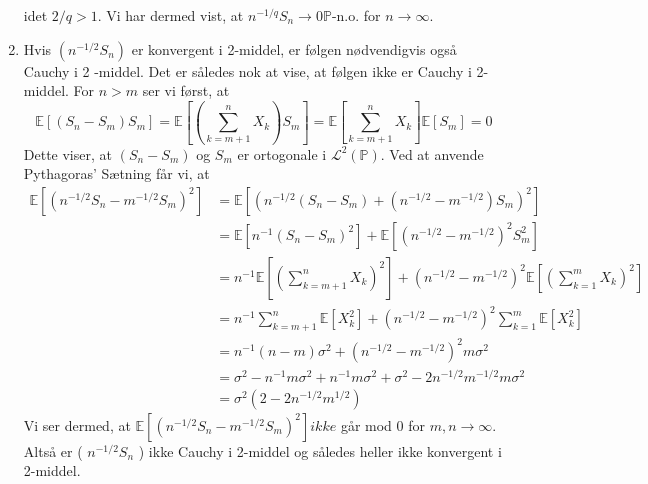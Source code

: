 \documentclass{Class}
\begin{document}
\begin{enumerate}
    idet $2 / q>1$. Vi har dermed vist, at $n^{-1 / q} S_n \rightarrow 0 \mathbb{P}$-n.o. for $n \rightarrow \infty$.
    \item Hvis $\left(n^{-1 / 2} S_n\right)$ er konvergent i 2-middel, er følgen nødvendigvis også Cauchy i 2 -middel. Det er således nok at vise, at følgen ikke er Cauchy i 2-middel. For $n>m$ ser vi først, at
    $$
    \mathbb{E}\left[\left(S_n-S_m\right) S_m\right]=\mathbb{E}\left[\left(\sum_{k=m+1}^n X_k\right) S_m\right]=\mathbb{E}\left[\sum_{k=m+1}^n X_k\right] \mathbb{E}\left[S_m\right]=0
    $$
    Dette viser, at $\left(S_n-S_m\right)$ og $S_m$ er ortogonale i $\mathcal{L}^2(\mathbb{P})$. Ved at anvende Pythagoras' Sætning får vi, at
    $$
    \begin{aligned}
    \mathbb{E}\left[\left(n^{-1 / 2} S_n-m^{-1 / 2} S_m\right)^2\right] & =\mathbb{E}\left[\left(n^{-1 / 2}\left(S_n-S_m\right)+\left(n^{-1 / 2}-m^{-1 / 2}\right) S_m\right)^2\right] \\
    & =\mathbb{E}\left[n^{-1}\left(S_n-S_m\right)^2\right]+\mathbb{E}\left[\left(n^{-1 / 2}-m^{-1 / 2}\right)^2 S_m^2\right] \\
    & =n^{-1} \mathbb{E}\left[\left(\sum_{k=m+1}^n X_k\right)^2\right]+\left(n^{-1 / 2}-m^{-1 / 2}\right)^2 \mathbb{E}\left[\left(\sum_{k=1}^m X_k\right)^2\right] \\
    & =n^{-1} \sum_{k=m+1}^n \mathbb{E}\left[X_k^2\right]+\left(n^{-1 / 2}-m^{-1 / 2}\right)^2 \sum_{k=1}^m \mathbb{E}\left[X_k^2\right] \\
    & =n^{-1}(n-m) \sigma^2+\left(n^{-1 / 2}-m^{-1 / 2}\right)^2 m \sigma^2 \\
    & =\sigma^2-n^{-1} m \sigma^2+n^{-1} m \sigma^2+\sigma^2-2 n^{-1 / 2} m^{-1 / 2} m \sigma^2 \\
    & =\sigma^2\left(2-2 n^{-1 / 2} m^{1 / 2}\right)
    \end{aligned}
    $$
    Vi ser dermed, at $\mathbb{E}\left[\left(n^{-1 / 2} S_n-m^{-1 / 2} S_m\right)^2\right] i k k e$ går mod 0 for $m, n \rightarrow \infty$. Altså er ( $n^{-1 / 2} S_n$ ) ikke Cauchy i 2-middel og således heller ikke konvergent i 2-middel.
\end{enumerate}
\end{document}
